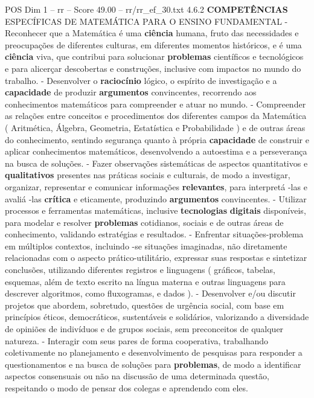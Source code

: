 \begin{textsample}{POS Dim 1 – rr – Score 49.00 – rr/rr\_ef\_30.txt}  \label{ex:f1_pos_214}
4.6.2 \textbf{COMPETÊNCIAS} ESPECÍFICAS DE MATEMÁTICA PARA O ENSINO FUNDAMENTAL - Reconhecer que a Matemática é uma \textbf{ciência} humana, fruto das necessidades e preocupações de diferentes culturas, em diferentes momentos históricos, e é uma \textbf{ciência} viva, que contribui para solucionar \textbf{problemas} científicos e tecnológicos e para alicerçar descobertas e construções, inclusive com impactos no mundo do trabalho. - Desenvolver o \textbf{raciocínio} lógico, o espírito de investigação e a \textbf{capacidade} de produzir \textbf{argumentos} convincentes, recorrendo aos conhecimentos matemáticos para compreender e atuar no mundo. - Compreender as relações entre conceitos e procedimentos dos diferentes campos da Matemática ( Aritmética, Álgebra, Geometria, Estatística e Probabilidade ) e de outras áreas do conhecimento, sentindo segurança quanto à própria \textbf{capacidade} de construir e aplicar conhecimentos matemáticos, desenvolvendo a autoestima e a perseverança na busca de soluções. - Fazer observações sistemáticas de aspectos quantitativos e \textbf{qualitativos} presentes nas práticas sociais e culturais, de modo a investigar, organizar, representar e comunicar informações \textbf{relevantes}, para interpretá -las e avaliá -las \textbf{crítica} e eticamente, produzindo \textbf{argumentos} convincentes. - Utilizar processos e ferramentas matemáticas, inclusive \textbf{tecnologias} \textbf{digitais} disponíveis, para modelar e resolver \textbf{problemas} cotidianos, sociais e de outras áreas de conhecimento, validando estratégias e resultados. - Enfrentar situações-problema em múltiplos contextos, incluindo -se situações imaginadas, não diretamente relacionadas com o aspecto prático-utilitário, expressar suas respostas e sintetizar conclusões, utilizando diferentes registros e linguagens ( gráficos, tabelas, esquemas, além de texto escrito na língua materna e outras linguagens para descrever algoritmos, como fluxogramas, e dados ). - Desenvolver e/ou discutir projetos que abordem, sobretudo, questões de urgência social, com base em princípios éticos, democráticos, sustentáveis e solidários, valorizando a diversidade de opiniões de indivíduos e de grupos sociais, sem preconceitos de qualquer natureza. - Interagir com seus pares de forma cooperativa, trabalhando coletivamente no planejamento e desenvolvimento de pesquisas para responder a questionamentos e na busca de soluções para \textbf{problemas}, de modo a identificar aspectos consensuais ou não na discussão de uma determinada questão, respeitando o modo de pensar dos colegas e aprendendo com eles.

\end{textsample}

